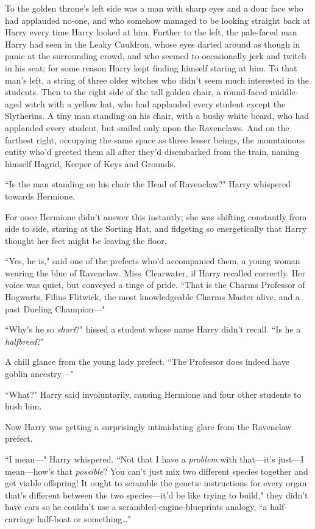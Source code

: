 To the golden throne's left side was a man with sharp eyes and a dour face who had applauded no-one, and who somehow managed to be looking straight back at Harry every time Harry looked at him. Further to the left, the pale-faced man Harry had seen in the Leaky Cauldron, whose eyes darted around as though in panic at the surrounding crowd, and who seemed to occasionally jerk and twitch in his seat; for some reason Harry kept finding himself staring at him. To that man's left, a string of three older witches who didn't seem much interested in the students. Then to the right side of the tall golden chair, a round-faced middle-aged witch with a yellow hat, who had applauded every student except the Slytherins. A tiny man standing on his chair, with a bushy white beard, who had applauded every student, but smiled only upon the Ravenclaws. And on the farthest right, occupying the same space as three lesser beings, the mountainous entity who'd greeted them all after they'd disembarked from the train, naming himself Hagrid, Keeper of Keys and Grounds.

``Is the man standing on his chair the Head of Ravenclaw?" Harry whispered towards Hermione.

For once Hermione didn't answer this instantly; she was shifting constantly from side to side, staring at the Sorting Hat, and fidgeting so energetically that Harry thought her feet might be leaving the floor.

``Yes, he is," said one of the prefects who'd accompanied them, a young woman wearing the blue of Ravenclaw. Miss~Clearwater, if Harry recalled correctly. Her voice was quiet, but conveyed a tinge of pride. ``That is the Charms Professor of Hogwarts, Filius Flitwick, the most knowledgeable Charms Master alive, and a past Dueling Champion—"

``Why's he so \emph{short}?" hissed a student whose name Harry didn't recall. ``Is he a \emph{halfbreed}?"

A chill glance from the young lady prefect. ``The Professor does indeed have goblin ancestry—"

``What?" Harry said involuntarily, causing Hermione and four other students to hush him.

Now Harry was getting a surprisingly intimidating glare from the Ravenclaw prefect.

``I mean—" Harry whispered. ``Not that I have a \emph{problem} with that—it's just—I mean—how's that \emph{possible}? You can't just mix two different species together and get viable offspring! It ought to scramble the genetic instructions for every organ that's different between the two species—it'd be like trying to build," they didn't have cars so he couldn't use a scrambled-engine-blueprints analogy, ``a half-carriage half-boat or something{\ldots}"

